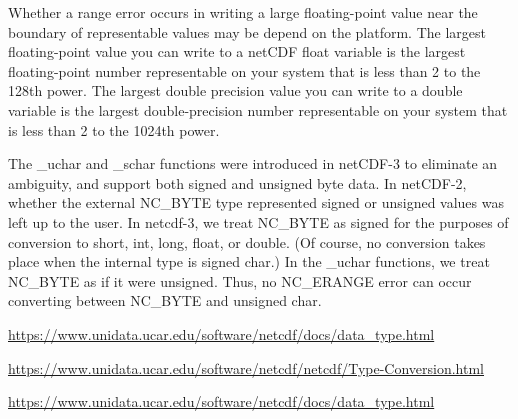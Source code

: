 \begin{framed}
Whether a range error occurs in writing a large floating-point value near the boundary of representable values may be depend on the platform. The largest floating-point value you can write to a netCDF float variable is the largest floating-point number representable on your system that is less than 2 to the 128th power. The largest double precision value you can write to a double variable is the largest double-precision number representable on your system that is less than 2 to the 1024th power.

The \_uchar and \_schar functions were introduced in netCDF-3 to eliminate an ambiguity, and support both signed and unsigned byte data. In netCDF-2, whether the external NC\_BYTE type represented signed or unsigned values was left up to the user. In netcdf-3, we treat NC\_BYTE as signed for the purposes of conversion to short, int, long, float, or double. (Of course, no conversion takes place when the internal type is signed char.) In the \_uchar functions, we treat NC\_BYTE as if it were unsigned. Thus, no NC\_ERANGE error can occur converting between NC\_BYTE and unsigned char.

\url{https://www.unidata.ucar.edu/software/netcdf/docs/data_type.html}

\url{https://www.unidata.ucar.edu/software/netcdf/netcdf/Type-Conversion.html}

\end{framed}

\url{https://www.unidata.ucar.edu/software/netcdf/docs/data_type.html}

